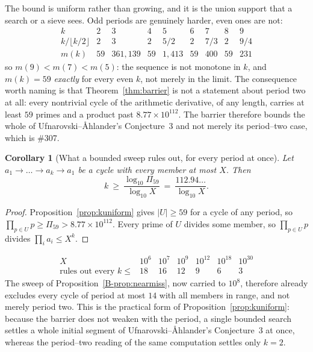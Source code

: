 \documentclass[11pt]{article}
\newtheorem{corollary}[theorem]{Corollary}
\theoremstyle{definition}
\begin{document}
The bound is uniform rather than growing, and it is the union support that a search or a sieve sees.
Odd periods are genuinely harder, even ones are not:
\[
\begin{array}{l|cccccccc}
k & 2 & 3 & 4 & 5 & 6 & 7 & 8 & 9\\\hline
k/\lfloor k/2\rfloor & 2 & 3 & 2 & 5/2 & 2 & 7/3 & 2 & 9/4\\
m(k) & 59 & 361{,}139 & 59 & 1{,}413 & 59 & 400 & 59 & 231
\end{array}
\]
so $m(9)<m(7)<m(5)$: the sequence is not monotone in $k$, and $m(k)=59$ \emph{exactly} for every
even $k$, not merely in the limit. The consequence
worth naming is that Theorem~\ref{thm:barrier} is not a statement about period two at all: every
nontrivial cycle of the arithmetic derivative, of any length, carries at least $59$ primes and a
product past $8.77\times10^{112}$. The barrier therefore bounds the whole of
Ufnarovski--\AA hlander's Conjecture~3 and not merely its period--two case, which is \#307.

\begin{corollary}[What a bounded sweep rules out, for every period at once]\label{cor:sweepperiod}
Let $a_1\to\dots\to a_k\to a_1$ be a cycle with every member at most $X$. Then
\[ k\ \ge\ \frac{\log_{10}\Pi_{59}}{\log_{10}X}\ =\ \frac{112.94\ldots}{\log_{10}X}. \]
\end{corollary}
\begin{proof}
Proposition~\ref{prop:kuniform} gives $|U|\ge59$ for a cycle of any period, so
$\prod_{p\in U}p\ge\Pi_{59}>8.77\times10^{112}$. Every prime of $U$ divides some member, so
$\prod_{p\in U}p$ divides $\prod_i a_i\le X^{k}$.
\end{proof}

\[
\begin{array}{l|cccccc}
X & 10^{6} & 10^{7} & 10^{9} & 10^{12} & 10^{18} & 10^{30}\\\hline
\text{rules out every }k\le & 18 & 16 & 12 & 9 & 6 & 3
\end{array}
\]
The sweep of Proposition~\ref{B-prop:nearmiss}, now carried to $10^{8}$, therefore already excludes
every cycle of period at most $14$ with all members in range, and not merely period two. This is the practical form
of Proposition~\ref{prop:kuniform}: because the barrier does not weaken with the period, a single
bounded search settles a whole initial segment of Ufnarovski--\AA hlander's Conjecture~3 at once,
whereas the period--two reading of the same computation settles only $k=2$.
\end{document}
